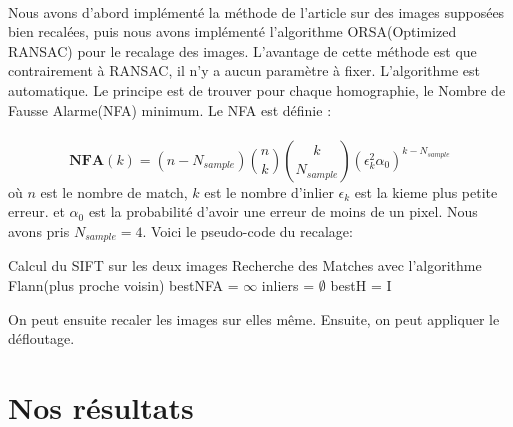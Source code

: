\documentclass[a4paper,10pt]{report}
\begin{document}
\paragraph{}
Nous avons d'abord implémenté la méthode de l'article sur des images supposées bien recalées, puis
nous avons implémenté l'algorithme ORSA(Optimized RANSAC) pour le recalage des images.
L'avantage de cette méthode est que contrairement à RANSAC, il n'y a aucun
paramètre à fixer. L'algorithme est automatique. Le principe est de trouver 
pour chaque homographie, le Nombre de Fausse Alarme(NFA) minimum. Le 
NFA est définie  :
\\\\
$$
\mathbf{NFA}(k) = (n-N_{sample})\binom{n}{k}\binom{k}{N_{sample}}(\epsilon_k^2 \alpha_0)^{k-N_{sample}}
$$
où $n$ est le nombre de match, $k$ est le nombre d'inlier $\epsilon_k$ est la kieme plus petite erreur. et $\alpha_0$ est la probabilité
d'avoir une erreur de moins de un pixel. Nous avons pris $N_{sample}=4$.
Voici le pseudo-code du recalage:\\
\begin{algorithm}[H]
   Calcul du SIFT sur les deux images\;
   Recherche des Matches avec l'algorithme Flann(plus proche voisin)\;
   bestNFA = $\infty$\;
   inliers = $\emptyset$\;
   bestH = I\;
\end{algorithm}

On peut ensuite recaler les images sur elles même. Ensuite, on peut appliquer le défloutage.
\begin{algorithm}
  
\end{algorithm}




\section{Nos résultats}
\end{document}
